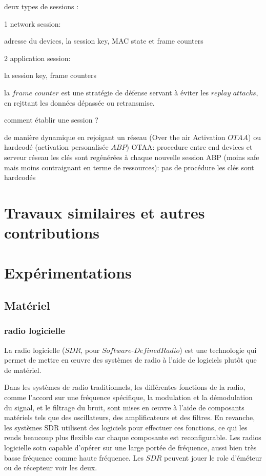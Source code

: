 \documentclass[12pt,a4paper,oneside, titlepage]{report}
\begin{document}
deux types de sessions :

1 network session:

adresse du devices, la session key, MAC state et frame counters

2 application session:

la session key, frame counters

la $frame$ $counter$ est une stratégie de défense servant à éviter les $replay$ $attacks$, en rejttant les données dépassée ou retransmise. 


comment établir une session ?

de manière dynamique en rejoigant un réseau (Over the air Activation $OTAA$) ou hardcodé (activation personalisée $ABP$)
OTAA:
procedure entre end devices et serveur réseau
les clés sont regénérées à chaque nouvelle session
ABP (moins safe mais moins contraignant en terme de ressources):
pas de procédure
les clés sont hardcodés


\newpage

\chapter{Travaux similaires et autres contributions}


\newpage

\chapter{Expérimentations}

\section{Matériel}

\subsection{radio logicielle}

La radio logicielle ($SDR$, pour $Software$-$Defined Radio$) est une technologie qui permet de mettre en œuvre des systèmes de radio à l'aide de logiciels plutôt que de matériel. 

Dans les systèmes de radio traditionnels, les différentes fonctions de la radio, comme l'accord sur une fréquence spécifique, la modulation et la démodulation du signal, et le filtrage du bruit, sont mises en œuvre à l'aide de composants matériels tels que des oscillateurs, des amplificateurs et des filtres. En revanche, les systèmes SDR utilisent des logiciels pour effectuer ces fonctions, ce qui les rends beaucoup plus flexible car chaque composante est reconfigurable. Les radios logicielle sotn capable d'opérer sur une large portée de fréquence, aussi bien très basse fréquence comme haute fréquence.
Les $SDR$ peuvent jouer le role d'éméteur ou de récepteur voir les deux.
\end{document}
